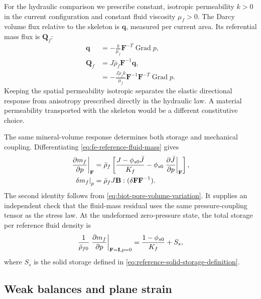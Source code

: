 For the hydraulic comparison we prescribe constant, isotropic permeability
\(k>0\) in the current configuration and constant fluid viscosity
\(\mu_f>0\). The Darcy volume flux relative to the skeleton is
\(\mathbf q\), measured per current area. Its referential mass flux is
\(\mathbf Q_f\):
\begin{align}
 \mathbf q&=-\frac{k}{\mu_f}\mathbf F^{-T}
                 \operatorname{Grad}p,
 \label{eq:fe-spatial-darcy-flux}\\
 \mathbf Q_f&=J\bar\rho_f\mathbf F^{-1}\mathbf q,
 \label{eq:fe-reference-mass-flux}\\
 &=-\frac{J\bar\rho_f k}{\mu_f}
      \mathbf F^{-1}\mathbf F^{-T}\operatorname{Grad}p.
 \label{eq:fe-reference-darcy-law}
\end{align}
Keeping the spatial permeability isotropic separates the elastic
directional response from anisotropy prescribed directly in the hydraulic
law. A material permeability transported with the skeleton would be a
different constitutive choice.

The same mineral-volume response determines both storage and mechanical
coupling. Differentiating \eqref{eq:fe-reference-fluid-mass} gives
\begin{align}
 \left.\frac{\partial m_f}{\partial p}\right|_{\mathbf F}
 &=\bar\rho_f\left[
       \frac{J-\phi_{s0}\bar J}{K_f}
       -\phi_{s0}\left.\frac{\partial \bar J}{\partial p}\right|_{\mathbf F}
                  \right],
 \label{eq:fe-fluid-storage}\\
 \left.\delta m_f\right|_p
 &=\bar\rho_f J\mathbf B:
                  (\delta\mathbf F\mathbf F^{-1}).
 \label{eq:fe-fluid-deformation-coupling}
\end{align}
The second identity follows from
\eqref{eq:biot-pore-volume-variation}. It supplies an independent check
that the fluid-mass residual uses the same pressure-coupling tensor as
the stress law. At the undeformed zero-pressure state, the total storage
per reference fluid density is
\begin{equation}
 \frac{1}{\bar\rho_{f0}}
 \left.\frac{\partial m_f}{\partial p}\right|_{\mathbf F=\mathbf I,p=0}
 =\frac{1-\phi_{s0}}{K_f}+S_s,
 \label{eq:fe-reference-total-storage}
\end{equation}
where \(S_s\) is the solid storage defined in
\eqref{eq:reference-solid-storage-definition}.

\subsection{Weak balances and plane strain}
\label{sec:fe-weak-balances}

